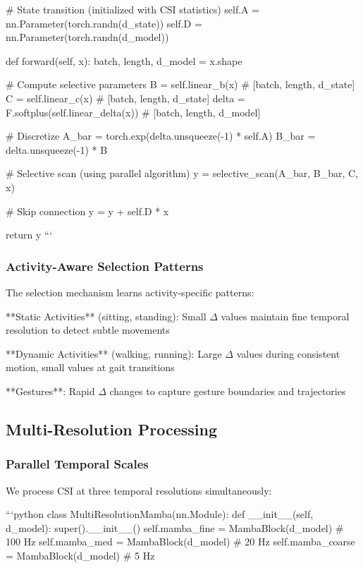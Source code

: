 \documentclass[10pt,journal,compsoc]{IEEEtran}
\begin{document}
        # State transition (initialized with CSI statistics)
        self.A = nn.Parameter(torch.randn(d_state))
        self.D = nn.Parameter(torch.randn(d_model))
        
    def forward(self, x):
        batch, length, d_model = x.shape
        
        # Compute selective parameters
        B = self.linear_b(x)  # [batch, length, d_state]
        C = self.linear_c(x)  # [batch, length, d_state]
        delta = F.softplus(self.linear_delta(x))  # [batch, length, d_model]
        
        # Discretize
        A_bar = torch.exp(delta.unsqueeze(-1) * self.A)
        B_bar = delta.unsqueeze(-1) * B
        
        # Selective scan (using parallel algorithm)
        y = selective_scan(A_bar, B_bar, C, x)
        
        # Skip connection
        y = y + self.D * x
        
        return y
```

\subsubsection{Activity-Aware Selection Patterns}

The selection mechanism learns activity-specific patterns:

**Static Activities** (sitting, standing): Small $\Delta$ values maintain fine temporal resolution to detect subtle movements

**Dynamic Activities** (walking, running): Large $\Delta$ values during consistent motion, small values at gait transitions

**Gestures**: Rapid $\Delta$ changes to capture gesture boundaries and trajectories

\subsection{Multi-Resolution Processing}

\subsubsection{Parallel Temporal Scales}

We process CSI at three temporal resolutions simultaneously:

```python
class MultiResolutionMamba(nn.Module):
    def __init__(self, d_model):
        super().__init__()
        self.mamba_fine = MambaBlock(d_model)    # 100 Hz
        self.mamba_med = MambaBlock(d_model)     # 20 Hz  
        self.mamba_coarse = MambaBlock(d_model)  # 5 Hz
        
\end{document}
